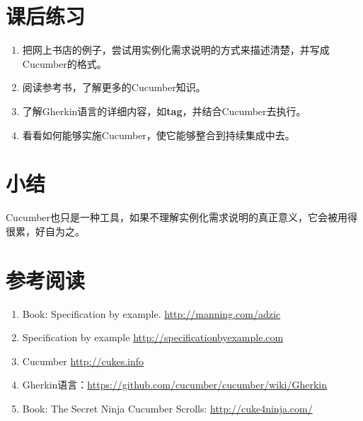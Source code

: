 \section{课后练习}
\label{课后练习}

\begin{enumerate}
\item 把网上书店的例子，尝试用实例化需求说明的方式来描述清楚，并写成Cucumber的格式。

\item 阅读参考书，了解更多的Cucumber知识。

\item 了解Gherkin语言的详细内容，如\textbf{tag}，并结合Cucumber去执行。

\item 看看如何能够实施Cucumber，使它能够整合到持续集成中去。

\end{enumerate}

\section{小结}
\label{小结}

Cucumber也只是一种工具，如果不理解实例化需求说明的真正意义，它会被用得很累，好自为之。

\section{参考阅读}
\label{参考阅读}

\begin{enumerate}
\item Book: Specification by example. \href{http://manning.com/adzic}{http:/\slash manning.com\slash adzic}

\item Specification by example \href{http://specificationbyexample.com}{http:/\slash specificationbyexample.com}

\item Cucumber \href{http://cukes.info}{http:/\slash cukes.info}

\item Gherkin语言：\href{https://github.com/cucumber/cucumber/wiki/Gherkin}{https:/\slash github.com\slash cucumber\slash cucumber\slash wiki\slash Gherkin}

\item Book: The Secret Ninja Cucumber Scrolls: \href{http://cuke4ninja.com/}{http:/\slash cuke4ninja.com\slash }

\end{enumerate}

